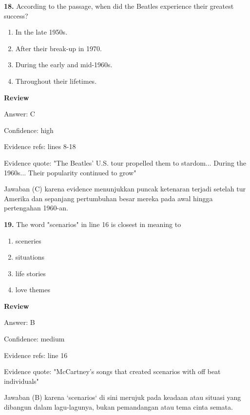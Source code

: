 \documentclass[12pt]{article}
\begin{document}
\endgroup
\par
\vspace{0.25\baselineskip}
\noindent\textbf{18.} According to the passage, when did the Beatles experience their greatest success?
\begin{enumerate}[label=(\Alph*),leftmargin=*,itemsep=0.2em]
\item In the late 1950s.
\item After their break-up in 1970.
\item During the early and mid-1960s.
\item Throughout their lifetimes.
\end{enumerate}
\par
\begingroup
\setlength{\parskip}{0pt}
\setlength{\parindent}{0pt}
\textbf{Review}\par
Answer: C\par
Confidence: high\par
Evidence refs: lines 8-18\par
Evidence quote: "The Beatles' U.S. tour propelled them to stardom... During the 1960s... Their popularity continued to grow"\par
Jawaban (C) karena evidence menunjukkan puncak ketenaran terjadi setelah tur Amerika dan sepanjang pertumbuhan besar mereka pada awal hingga pertengahan 1960-an.\par
\endgroup
\par
\vspace{0.25\baselineskip}
\noindent\textbf{19.} The word "scenarios" in line 16 is closest in meaning to
\begin{enumerate}[label=(\Alph*),leftmargin=*,itemsep=0.2em]
\item sceneries
\item situations
\item life stories
\item love themes
\end{enumerate}
\par
\begingroup
\setlength{\parskip}{0pt}
\setlength{\parindent}{0pt}
\textbf{Review}\par
Answer: B\par
Confidence: medium\par
Evidence refs: line 16\par
Evidence quote: "McCartney's songs that created scenarios with off beat individuals"\par
Jawaban (B) karena `scenarios` di sini merujuk pada keadaan atau situasi yang dibangun dalam lagu-lagunya, bukan pemandangan atau tema cinta semata.\par
\end{document}
